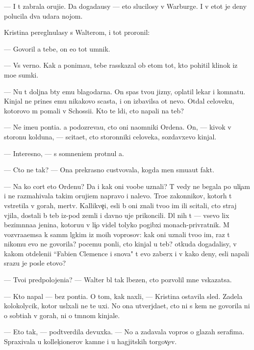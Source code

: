 \documentclass[10pt]{book}
\begin{document}
— I t{\yi} zabrala oruji{\y}e. Da{\y} dogada{\y}usy — eto slucilosy v Warburge. I v etot je deny polucila dva udara nojom.

Kristina peregl{\ia}nulasy s Walterom, i tot proronil:

— Govoril {\y}a tebe, on {\y}e{\x}o tot umnik.

— Vs{\e} verno. Kak {\y}a ponima{\y}u, tebe rasskazal ob etom tot, kto pohitil klinok iz mo{\y}e{\y} sumki.

— Nu t{\yi} doljna b{\yi}ty {\y}emu blagodarna. On spas tvo{\y}u jizny, oplatil lekar{\ia} i komnatu. Kinjal ne prines {\y}emu nikakovo scast{\y}a, i on izbavilsa ot nevo. Otdal celoveku, kotorovo m{\yi} po{\y}mali v Schossi{\y}i. Kto te l{\io}di, cto napali na teb{\ia}?

— Ne ime{\y}u pon{\ia}ti{\y}a. {\Y}a podozreva{\y}u, cto oni na{\y}omniki Ordena. On, — kivok v storonu kolduna, — sci\-ta\-{\y}et, cto storonniki celoveka, sozdavxevo kinjal.

— Interesno, — s somneni{\y}em pro\-t{\ia}\-nul {\y}a.

— Cto ne tak? — Ona pre\-kras\-no custvovala, kogda men{\ia} smu{\x}a{\y}ut fakt{\yi}.

— Na ko{\y} cort eto Ordenu? Da i kak oni voob{\x}e uznali? T{\yi} vedy ne begala po uli{\c}am i ne razmahivala takim oruji{\y}em napravo i nalevo. Tro{\y}e zakonnikov, kotor{\yi}h t{\yi} vstretila v gorah, mertv{\yi}. Kallikve{\c}i, {\y}esli b{\yi} oni znali tvo{\y}o im{\ia} ili scitali, cto straj v{\yi}jila, dostali b{\yi} teb{\ia} iz-pod zemli i davno uje prikoncili. Dl{\ia} nih t{\yi} — vsevo lix bez\-im{\ia}n\-na{\y}a jen{\x}ina, kotoru{\y}u v li{\c}o videl tolyko pogibxi{\y} monach-privratnik. M{\yi} vozvra{\x}a{\y}emsa k sam{\yi}m l{\e}gkim iz mo{\y}ih voprosov: kak oni uznali tvo{\y}o im{\ia}, raz t{\yi} nikomu {\y}evo ne govorila? pocemu pon{\ia}li, cto kinjal u teb{\ia}? otkuda do\-ga\-da\-lisy, v kakom otdeleni{\y}i ``Fabien Clemence i s{\yi}nov{\y}a" t{\yi} {\y}evo zaber{\e}x i v kako{\y} deny, {\y}esli napali srazu je posle etovo?

— Tvo{\y}i predpolojeni{\y}a? — Walter b{\yi}l tak l{\io}bezen, cto pozvolil mne v{\yi}skazatsa.

— Kto napal — bez pon{\ia}ti{\y}a. O tom, kak naxli, — Kristina ostavila sled{\yi}. Zadela kolokolycik, kotor{\yi}{\y} usl{\yi}xali ne te uxi. No ona utverjda{\y}et, cto ni s kem ne govorila ni o sob{\yi}ti{\y}ah v gorah, ni o t{\e}mnom kinjale.

— Eto tak, — podtverdila devuxka. — No {\y}a zadavala vopros{\yi} o glazah serafima. Spraxivala u kollek{\c}ionerov kamne{\y} i u hagjitskih torgov{\c}ev.
\end{document}

